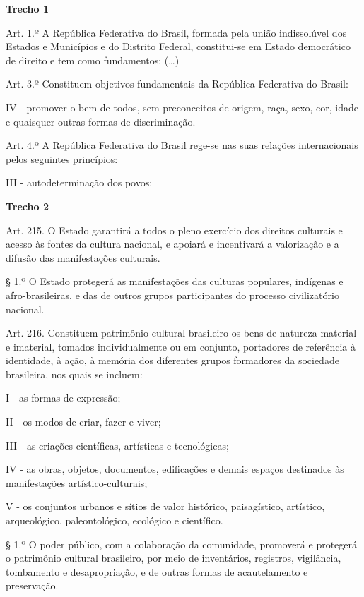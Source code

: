 \begin{myquote}

\textbf{Trecho 1}

Art. 1.º A República Federativa do Brasil, formada pela união
indissolúvel dos Estados e Municípios e do Distrito Federal,
constitui-se em Estado democrático de direito e tem como fundamentos: (\ldots{})

Art. 3.º Constituem objetivos fundamentais da República Federativa do
Brasil:

IV - promover o bem de todos, sem preconceitos de origem, raça, sexo,
cor, idade e quaisquer outras formas de discriminação.

Art. 4.º A República Federativa do Brasil rege-se nas suas relações
internacionais pelos seguintes princípios:

III - autodeterminação dos povos;

\textbf{Trecho 2}

Art. 215. O Estado garantirá a todos o pleno exercício dos direitos
culturais e acesso às fontes da cultura nacional, e apoiará e
incentivará a valorização e a difusão das manifestações culturais.

§ 1.º O Estado protegerá as manifestações das culturas populares,
indígenas e afro-brasileiras, e das de outros grupos participantes do
processo civilizatório nacional. 

Art. 216. Constituem patrimônio
cultural brasileiro os bens de natureza material e imaterial, tomados
individualmente ou em conjunto, portadores de referência à identidade, à
ação, à memória dos diferentes grupos formadores da sociedade
brasileira, nos quais se incluem:

I - as formas de expressão;

II - os modos de criar, fazer e viver;

III - as criações científicas, artísticas e tecnológicas;

IV - as obras, objetos, documentos, edificações e demais espaços
destinados às manifestações artístico-culturais;

V - os conjuntos urbanos e sítios de valor histórico, paisagístico,
artístico, arqueológico, paleontológico, ecológico e científico.

§ 1.º O poder público, com a colaboração da comunidade, promoverá e
protegerá o patrimônio cultural brasileiro, por meio de inventários,
registros, vigilância, tombamento e desapropriação, e de outras formas
de acautelamento e preservação. \\


\end{myquote}

